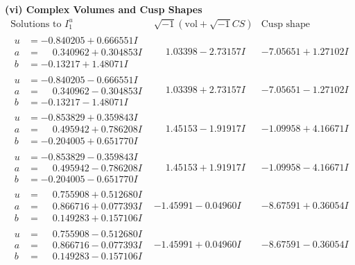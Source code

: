 \documentclass[1p]{elsarticle_modified}
\theoremstyle{definition}
\newcommand{\I}{\sqrt{-1}}
\begin{document}
\newpage\flushleft \textbf{(vi) Complex Volumes and Cusp Shapes}
$$\begin{array}{c|c|c}  
\text{Solutions to }I^u_{1}& \I (\text{vol} + \sqrt{-1}CS) & \text{Cusp shape}\\
 \hline 
\begin{aligned}
u &= -0.840205 + 0.666551 I \\
a &= \phantom{-}0.340962 + 0.304853 I \\
b &= -0.13217 + 1.48071 I\end{aligned}
 & \phantom{-}1.03398 - 2.73157 I & -7.05651 + 1.27102 I \\ \hline\begin{aligned}
u &= -0.840205 - 0.666551 I \\
a &= \phantom{-}0.340962 - 0.304853 I \\
b &= -0.13217 - 1.48071 I\end{aligned}
 & \phantom{-}1.03398 + 2.73157 I & -7.05651 - 1.27102 I \\ \hline\begin{aligned}
u &= -0.853829 + 0.359843 I \\
a &= \phantom{-}0.495942 + 0.786208 I \\
b &= -0.204005 + 0.651770 I\end{aligned}
 & \phantom{-}1.45153 - 1.91917 I & -1.09958 + 4.16671 I \\ \hline\begin{aligned}
u &= -0.853829 - 0.359843 I \\
a &= \phantom{-}0.495942 - 0.786208 I \\
b &= -0.204005 - 0.651770 I\end{aligned}
 & \phantom{-}1.45153 + 1.91917 I & -1.09958 - 4.16671 I \\ \hline\begin{aligned}
u &= \phantom{-}0.755908 + 0.512680 I \\
a &= \phantom{-}0.866716 + 0.077393 I \\
b &= \phantom{-}0.149283 + 0.157106 I\end{aligned}
 & -1.45991 - 0.04960 I & -8.67591 + 0.36054 I \\ \hline\begin{aligned}
u &= \phantom{-}0.755908 - 0.512680 I \\
a &= \phantom{-}0.866716 - 0.077393 I \\
b &= \phantom{-}0.149283 - 0.157106 I\end{aligned}
 & -1.45991 + 0.04960 I & -8.67591 - 0.36054 I \\ \hline\begin{aligned}

\end{aligned}
\end{array}$$
\end{document}
